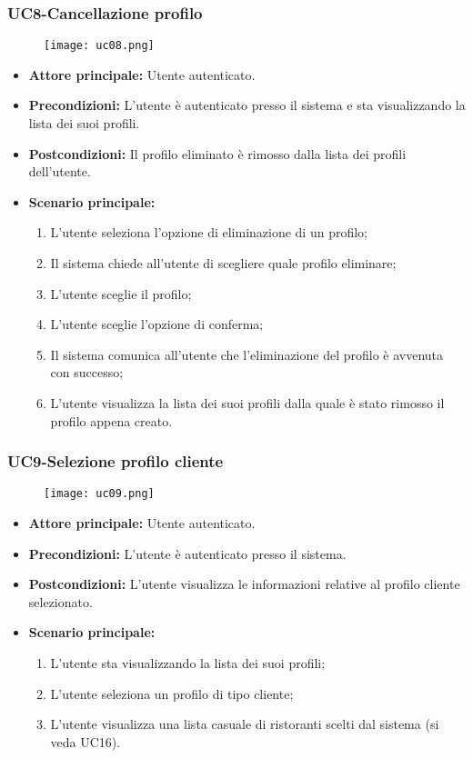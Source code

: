 \subsubsection{UC8-Cancellazione profilo}
\begin{figure}[h] \texttt{[image: uc08.png]} \end{figure}
\begin{itemize}
\item \textbf{Attore principale:} Utente autenticato.
\item \textbf{Precondizioni:} L'utente è autenticato presso il sistema e sta visualizzando la lista dei suoi profili.
\item \textbf{Postcondizioni:} Il profilo eliminato è rimosso dalla lista dei profili dell'utente.
\item \textbf{Scenario principale:}
\begin{enumerate}
    \item L'utente seleziona l'opzione di eliminazione di un profilo;
    \item Il sistema chiede all'utente di scegliere quale profilo eliminare;
    \item L'utente sceglie il profilo;
    \item L'utente sceglie l'opzione di conferma;
    \item Il sistema comunica all'utente che l'eliminazione del profilo è avvenuta con successo;
    \item L'utente visualizza la lista dei suoi profili dalla quale è stato rimosso il profilo appena creato.
\end{enumerate}
\end{itemize}

\subsubsection{UC9-Selezione profilo cliente}
\begin{figure}[h] \texttt{[image: uc09.png]} \end{figure}
\begin{itemize}
\item \textbf{Attore principale:} Utente autenticato.
\item \textbf{Precondizioni:} L'utente è autenticato presso il sistema.
\item \textbf{Postcondizioni:} L'utente visualizza le informazioni relative al profilo cliente selezionato.
\item \textbf{Scenario principale:}
\begin{enumerate}
    \item L'utente sta visualizzando la lista dei suoi profili;
    \item L'utente seleziona un profilo di tipo cliente;
    \item L'utente visualizza una lista casuale di ristoranti scelti dal sistema (si veda UC16).
\end{enumerate}
\end{itemize}


